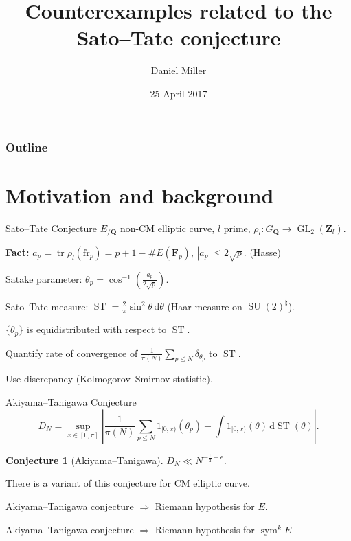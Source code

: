 \documentclass[handout]{beamer}
\title{Counterexamples related to the Sato--Tate conjecture}
\author{Daniel Miller}
\institute{Cornell University}
\date{25 April 2017}
\DeclareMathOperator{\GL}{GL}
\DeclareMathOperator{\ST}{ST}
\DeclareMathOperator{\SU}{SU}
\DeclareMathOperator{\sym}{sym}
\DeclareMathOperator{\tr}{tr}
\newcommand{\bF}{\mathbf{F}}
\newcommand{\bQ}{\mathbf{Q}}
\newcommand{\bZ}{\mathbf{Z}}
\newcommand{\dd}{\mathrm{d}}
\newcommand{\frob}{\mathrm{fr}}
\newtheorem{conjecture}{Conjecture}
\begin{document}
\begin{frame}
\titlepage
\end{frame}

\begin{frame}
\frametitle{Outline}
\tableofcontents
\end{frame}





\section{Motivation and background}

\begin{frame}{Sato--Tate Conjecture}
$E_{/\bQ}$ non-CM elliptic curve, $l$ prime, $\rho_l\colon G_\bQ \to \GL_2(\bZ_l)$. 
\pause

\textbf{Fact:}
$a_p = \tr\rho_l(\frob_p) = p+1 - \# E(\bF_p)$, 
\pause
$|a_p|\leqslant 2\sqrt p$. 
\pause
(Hasse)
\pause

Satake parameter: $\theta_p = \cos^{-1}\left( \frac{a_p}{2\sqrt p}\right)$. 
\pause

Sato--Tate measure: $\ST = \frac{2}{\pi} \sin^2 \theta\, \dd \theta$ 
\pause
(Haar measure on $\SU(2)^\natural$). 
\pause

\begin{theorem}[Taylor et.~al.]
$\{\theta_p\}$ is equidistributed with respect to $\ST$. 
\end{theorem}
\pause

Quantify rate of convergence of 
$\frac{1}{\pi(N)} \sum_{p\leqslant N} \delta_{\theta_p}$ to $\ST$. 
\pause

Use discrepancy (Kolmogorov--Smirnov statistic). 
\end{frame}


\begin{frame}{Akiyama--Tanigawa Conjecture}
\[
	D_N = \sup_{x\in [0,\pi]}\left| \frac{1}{\pi(N)} \sum_{p\leqslant N} 1_{[0,x)}(\theta_p) - \int 1_{[0,x)}(\theta) \, \dd\ST(\theta)\right| .
\]
\pause

\begin{conjecture}[Akiyama--Tanigawa]
$D_N \ll N^{-\frac 1 2 + \epsilon}$. 
\end{conjecture}
\pause

There is a variant of this conjecture for CM elliptic curve.
\pause

\begin{theorem}
Akiyama--Tanigawa conjecture $\Rightarrow$ Riemann hypothesis for $E$.
\end{theorem}
\pause

\begin{theorem}[Mazur]
Akiyama--Tanigawa conjecture $\Rightarrow$ Riemann hypothesis for $\sym^k E$
\end{theorem}
\end{frame}
\end{document}
